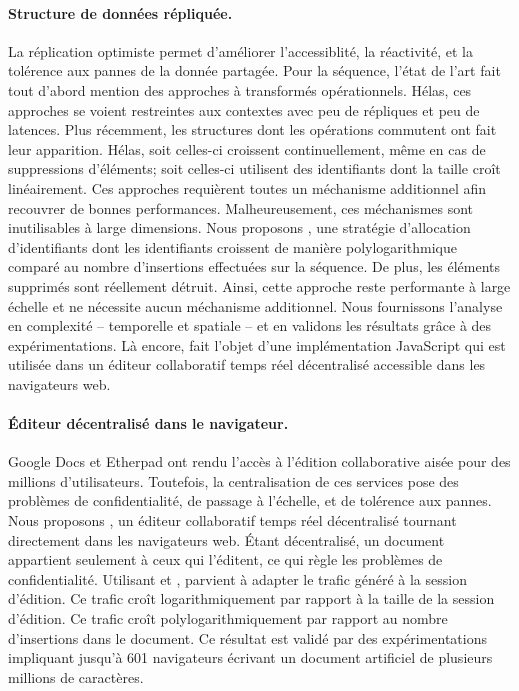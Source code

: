 \paragraph{Structure de données répliquée.} La réplication optimiste permet
d'améliorer l'accessiblité, la réactivité, et la tolérence aux pannes de la
donnée partagée. Pour la séquence, l'état de l'art fait tout d'abord mention des
approches à transformés opérationnels. Hélas, ces approches se voient
restreintes aux contextes avec peu de répliques et peu de latences. Plus
récemment, les structures dont les opérations commutent ont fait leur
apparition. Hélas, soit celles-ci croissent continuellement, même en cas de
suppressions d'éléments; soit celles-ci utilisent des identifiants dont la
taille croît linéairement. Ces approches requièrent toutes un méchanisme
additionnel afin recouvrer de bonnes performances. Malheureusement, ces
méchanismes sont inutilisables à large dimensions. Nous proposons \LSEQ, une
stratégie d'allocation d'identifiants dont les identifiants croissent de manière
polylogarithmique comparé au nombre d'insertions effectuées sur la séquence. De
plus, les éléments supprimés sont réellement détruit. Ainsi, cette approche
reste performante à large échelle et ne nécessite aucun méchanisme additionnel.
Nous fournissons l'analyse en complexité -- temporelle et spatiale -- et en
validons les résultats grâce à des expérimentations. Là encore, \LSEQ fait
l'objet d'une implémentation JavaScript qui est utilisée dans un éditeur
collaboratif temps réel décentralisé accessible dans les navigateurs web.


\paragraph{Éditeur décentralisé dans le navigateur.} Google Docs et Etherpad ont
rendu l'accès à l'édition collaborative aisée pour des millions
d'utilisateurs. Toutefois, la centralisation de ces services pose des problèmes
de confidentialité, de passage à l'échelle, et de tolérence aux pannes. Nous
proposons \CRATE, un éditeur collaboratif temps réel décentralisé tournant
directement dans les navigateurs web. Étant décentralisé, un document appartient
seulement à ceux qui l'éditent, ce qui règle les problèmes de
confidentialité. Utilisant \SPRAY et \LSEQ, \CRATE parvient à adapter le trafic
généré à la session d'édition. Ce trafic croît logarithmiquement par rapport à
la taille de la session d'édition. Ce trafic croît polylogarithmiquement par
rapport au nombre d'insertions dans le document. Ce résultat est validé par des
expérimentations impliquant jusqu'à 601 navigateurs écrivant un document
artificiel de plusieurs millions de caractères.

